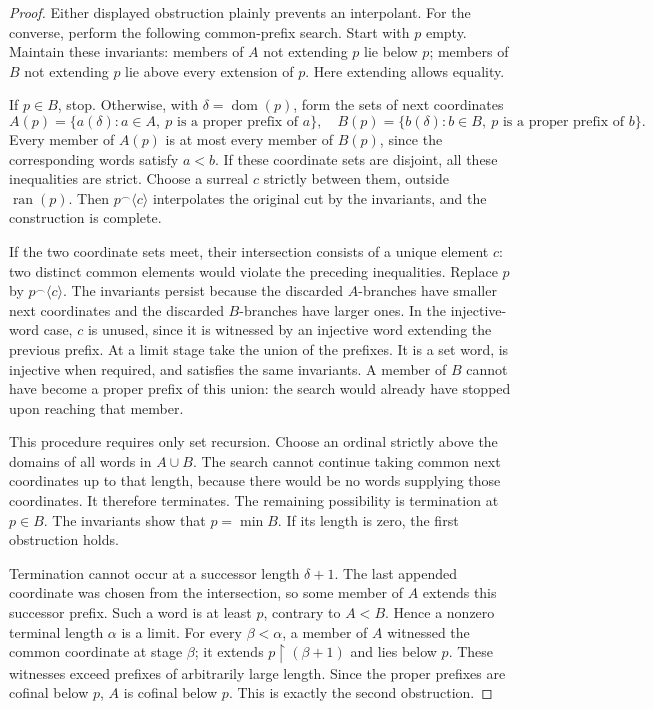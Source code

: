 \documentclass[11pt]{article}
\theoremstyle{definition}
\theoremstyle{remark}
\newcommand{\ran}{\operatorname{ran}}
\newcommand{\dom}{\operatorname{dom}}
\newcommand{\cat}{\mathbin{{}^\frown}}
\begin{document}
\begin{proof}
Either displayed obstruction plainly prevents an interpolant.
For the converse, perform the following common-prefix search.
Start with \(p\) empty.  Maintain these invariants:
members of \(A\) not extending \(p\) lie below \(p\);
members of \(B\) not extending \(p\) lie above every extension
of \(p\).  Here extending allows equality.

If \(p\in B\), stop.  Otherwise, with \(\delta=\dom(p)\),
form the sets of next coordinates
\[
 A(p)=\{a(\delta):a\in A,\ p\text{ is a proper prefix of }a\},
 \quad
 B(p)=\{b(\delta):b\in B,\ p\text{ is a proper prefix of }b\}.
\]
Every member of \(A(p)\) is at most every member of \(B(p)\),
since the corresponding words satisfy \(a<b\).
If these coordinate sets are disjoint, all these inequalities
are strict.  Choose a surreal \(c\) strictly between them,
outside \(\ran(p)\).  Then \(p\cat\langle c\rangle\)
interpolates the original cut by the invariants, and the
construction is complete.

If the two coordinate sets meet, their intersection consists
of a unique element \(c\): two distinct common elements would
violate the preceding inequalities.
Replace \(p\) by \(p\cat\langle c\rangle\).
The invariants persist because the discarded \(A\)-branches
have smaller next coordinates and the discarded \(B\)-branches
have larger ones.
In the injective-word case, \(c\) is unused, since it is
witnessed by an injective word extending the previous prefix.
At a limit stage take the union of the prefixes.
It is a set word, is injective when required, and satisfies
the same invariants.  A member of \(B\) cannot have become a
proper prefix of this union: the search would already have
stopped upon reaching that member.

This procedure requires only set recursion.
Choose an ordinal strictly above the domains of all words
in \(A\cup B\).  The search cannot continue taking common
next coordinates up to that length, because there would be
no words supplying those coordinates.  It therefore terminates.
The remaining possibility is termination at \(p\in B\).
The invariants show that \(p=\min B\).
If its length is zero, the first obstruction holds.

Termination cannot occur at a successor length
\(\delta+1\).
The last appended coordinate was chosen from the intersection,
so some member of \(A\) extends this successor prefix.
Such a word is at least \(p\), contrary to \(A<B\).
Hence a nonzero terminal length \(\alpha\) is a limit.
For every \(\beta<\alpha\), a member of \(A\) witnessed the
common coordinate at stage \(\beta\); it extends
\(p\restriction(\beta+1)\) and lies below \(p\).
These witnesses exceed prefixes of arbitrarily large length.
Since the proper prefixes are cofinal below \(p\), \(A\)
is cofinal below \(p\).  This is exactly the second obstruction.
\end{proof}
\end{document}
